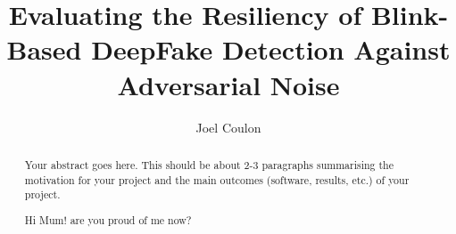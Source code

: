 \documentclass[a4paper]{report}
\author{Joel Coulon}
\title{Evaluating the Resiliency of Blink-Based DeepFake Detection Against Adversarial Noise}
\begin{document}


\pagestyle{plain}

\begin{abstract}
    Your abstract goes here. This should be about 2-3 paragraphs summarising the motivation for your project and the main outcomes (software, results, etc.) of your project. 
\end{abstract}

\renewcommand{\abstractname}{Acknowledgements}
\begin{abstract}
Hi Mum! {\tiny are you proud of me now?}
\end{abstract}

\tableofcontents
\listoffigures
{}
\newpage








\printbibliography

\appendix

\end{document}
